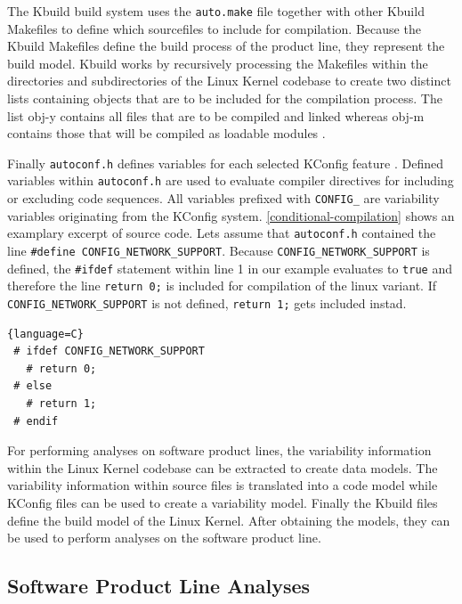 \documentclass[a4paper]{article}
\begin{document}
The Kbuild build system uses the \texttt{auto.make} file together with other Kbuild Makefiles to define which sourcefiles to include for compilation. Because the Kbuild Makefiles define the build process of the product line, they represent the build model. Kbuild works by recursively processing the Makefiles within the directories and subdirectories of the Linux Kernel codebase to create two distinct lists containing objects that are to be included for the compilation process. The list obj-y contains all files that are to be compiled and linked whereas  obj-m contains those that will be compiled as loadable modules \cite{nadi-linux-kernel}\cite{makefiles.txt}. 

Finally \texttt{autoconf.h} defines variables for each selected KConfig feature \cite{Tartler:2011:FCC:1966445.1966451}. Defined variables within \texttt{autoconf.h} are used to evaluate compiler directives for including or excluding code sequences. All variables prefixed with \texttt{CONFIG\_} are variability variables originating from the KConfig system. \autoref{conditional-compilation} shows an examplary excerpt of source code. Lets assume that \texttt{autoconf.h} contained the line \texttt{\#define CONFIG\_\-NETWORK\_\-SUPPORT}. Because \texttt{CONFIG\_\-NETWORK\_\-SUPPORT} is defined, the \texttt{\#ifdef} statement within line 1 in our example evaluates to \texttt{true} and therefore the line \texttt{return 0;} is included for compilation of the  linux variant. If \texttt{CONFIG\_\-NETWORK\_\-SUPPORT} is not defined, \texttt{return 1;} gets included instad.

\begin{lstlisting}[caption=Conditional Compilation within the Linux Kernel, label=conditional-compilation]{language=C}
 # ifdef CONFIG_NETWORK_SUPPORT
   # return 0;
 # else 
   # return 1;
 # endif
\end{lstlisting}

For performing analyses on software product lines, the variability information within the Linux Kernel codebase can be extracted to create data models. The variability information within source files is translated into a code model while KConfig files can be used to create a variability model. Finally the Kbuild files define the build model of the Linux Kernel. After obtaining the models, they can be used to perform analyses on the software product line.

\newpage

\subsection{Software Product Line Analyses}
\end{document}

